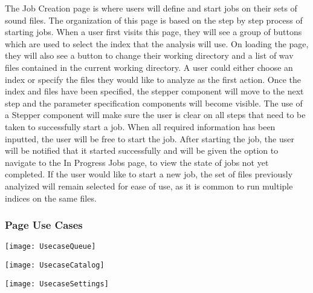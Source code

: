 The Job Creation page is where users will define and start jobs on their sets of sound files. The organization of this page is based on the step by step process of starting jobs. When a user first visits this page, they will see a group of buttons which are used to select the index that the analysis will use. On loading the page, they will also see a button to change their working directory and a list of wav files contained in the current working directory. A user could either choose an index or specify the files they would like to analyze as the first action. Once the index and files have been specified, the stepper component will move to the next step and the parameter specification components will become visible. The use of a Stepper component will make sure the user is clear on all steps that need to be taken to successfully start a job. When all required information has been inputted, the user will be free to start the job. After starting the job, the user will be notified that it started successfully and will be given the option to navigate to the In Progress Jobs page, to view the state of jobs not yet completed. If the user would like to start a new job, the set of files previously analyized will remain selected for ease of use, as it is common to run multiple indices on the same files.\par

\subsubsection{Page Use Cases}
\begin{center}
  \texttt{[image: UsecaseQueue]} \\[12pt]
\end{center}
\begin{center}
  \texttt{[image: UsecaseCatalog]} \\[12pt]
\end{center}
\begin{center}
  \texttt{[image: UsecaseSettings]} \\[12pt]
\end{center}

